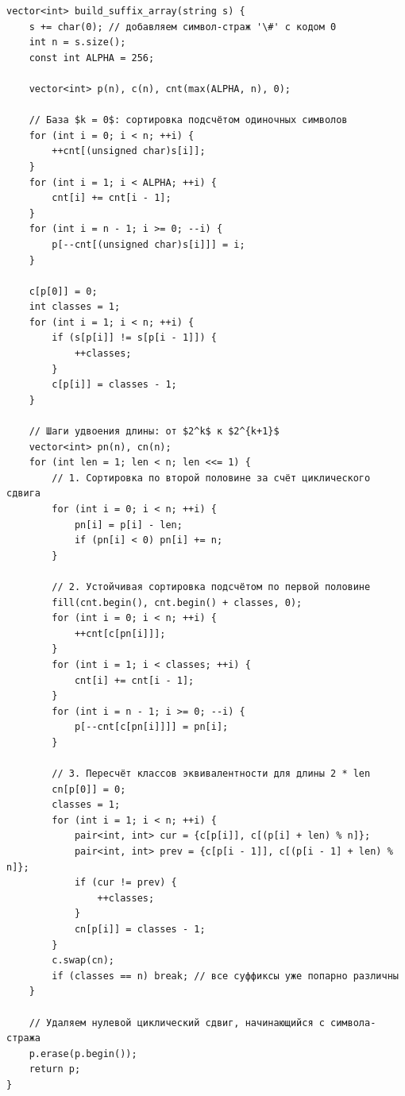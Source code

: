 \begin{lstlisting}[caption={Построение суффиксного массива за $O(n \log n)$}]
vector<int> build_suffix_array(string s) {
    s += char(0); // добавляем символ-страж '\#' с кодом 0
    int n = s.size();
    const int ALPHA = 256;

    vector<int> p(n), c(n), cnt(max(ALPHA, n), 0);

    // База $k = 0$: сортировка подсчётом одиночных символов
    for (int i = 0; i < n; ++i) {
        ++cnt[(unsigned char)s[i]];
    }
    for (int i = 1; i < ALPHA; ++i) {
        cnt[i] += cnt[i - 1];
    }
    for (int i = n - 1; i >= 0; --i) {
        p[--cnt[(unsigned char)s[i]]] = i;
    }

    c[p[0]] = 0;
    int classes = 1;
    for (int i = 1; i < n; ++i) {
        if (s[p[i]] != s[p[i - 1]]) {
            ++classes;
        }
        c[p[i]] = classes - 1;
    }

    // Шаги удвоения длины: от $2^k$ к $2^{k+1}$
    vector<int> pn(n), cn(n);
    for (int len = 1; len < n; len <<= 1) {
        // 1. Сортировка по второй половине за счёт циклического сдвига
        for (int i = 0; i < n; ++i) {
            pn[i] = p[i] - len;
            if (pn[i] < 0) pn[i] += n;
        }

        // 2. Устойчивая сортировка подсчётом по первой половине
        fill(cnt.begin(), cnt.begin() + classes, 0);
        for (int i = 0; i < n; ++i) {
            ++cnt[c[pn[i]]];
        }
        for (int i = 1; i < classes; ++i) {
            cnt[i] += cnt[i - 1];
        }
        for (int i = n - 1; i >= 0; --i) {
            p[--cnt[c[pn[i]]]] = pn[i];
        }

        // 3. Пересчёт классов эквивалентности для длины 2 * len
        cn[p[0]] = 0;
        classes = 1;
        for (int i = 1; i < n; ++i) {
            pair<int, int> cur = {c[p[i]], c[(p[i] + len) % n]};
            pair<int, int> prev = {c[p[i - 1]], c[(p[i - 1] + len) % n]};
            if (cur != prev) {
                ++classes;
            }
            cn[p[i]] = classes - 1;
        }
        c.swap(cn);
        if (classes == n) break; // все суффиксы уже попарно различны
    }

    // Удаляем нулевой циклический сдвиг, начинающийся с символа-стража
    p.erase(p.begin());
    return p;
}
\end{lstlisting}

